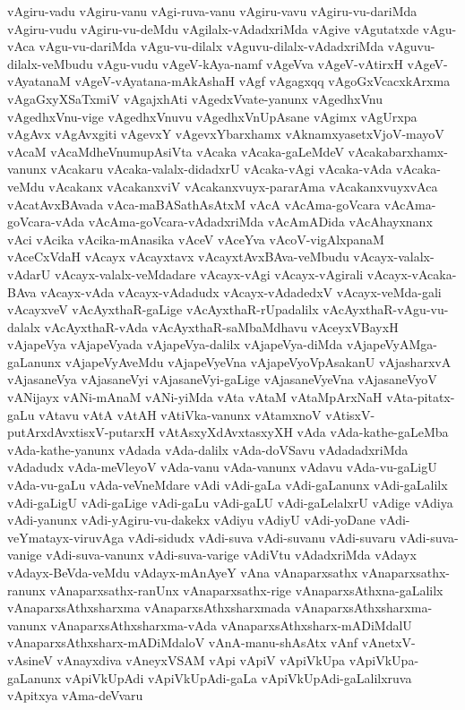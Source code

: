 {vAgiru-vadu
vAgiru-vanu
vAgi-ruva-vanu
vAgiru-vavu
vAgiru-vu-dariMda
vAgiru-vudu
vAgiru-vu-deMdu
vAgilalx-vAdadxriMda
vAgive
vAgutatxde
vAgu-vAca
vAgu-vu-dariMda
vAgu-vu-dilalx
vAguvu-dilalx-vAdadxriMda
vAguvu-dilalx-veMbudu
vAgu-vudu
vAgeV-kAya-namf
vAgeVva
vAgeV-vAtirxH
vAgeV-vAyatanaM
vAgeV-vAyatana-mAkAshaH
vAgf
vAgagxqq
vAgoGxVcacxkArxma
vAgaGxyXSaTxmiV
vAgajxhAti
vAgedxVvate-yanunx
vAgedhxVnu
vAgedhxVnu-vige
vAgedhxVnuvu
vAgedhxVnUpAsane
vAgimx
vAgUrxpa
vAgAvx
vAgAvxgiti
vAgevxY
vAgevxYbarxhamx
vAknamxyasetxVjoV-mayoV
vAcaM
vAcaMdheVnumupAsiVta
vAcaka
vAcaka-gaLeMdeV
vAcakabarxhamx-vanunx
vAcakaru
vAcaka-valalx-didadxrU
vAcaka-vAgi
vAcaka-vAda
vAcaka-veMdu
vAcakanx
vAcakanxviV
vAcakanxvuyx-pararAma
vAcakanxvuyxvAca
vAcatAvxBAvada
vAca-maBASathAsAtxM
vAcA
vAcAma-goVcara
vAcAma-goVcara-vAda
vAcAma-goVcara-vAdadxriMda
vAcAmADida
vAcAhayxnanx
vAci
vAcika
vAcika-mAnasika
vAceV
vAceYva
vAcoV-vigAlxpanaM
vAceCxVdaH
vAcayx
vAcayxtavx
vAcayxtAvxBAva-veMbudu
vAcayx-valalx-vAdarU
vAcayx-valalx-veMdadare
vAcayx-vAgi
vAcayx-vAgirali
vAcayx-vAcaka-BAva
vAcayx-vAda
vAcayx-vAdadudx
vAcayx-vAdadedxV
vAcayx-veMda-gali
vAcayxveV
vAcAyxthaR-gaLige
vAcAyxthaR-rUpadalilx
vAcAyxthaR-vAgu-vu-dalalx
vAcAyxthaR-vAda
vAcAyxthaR-saMbaMdhavu
vAceyxVBayxH
vAjapeVya
vAjapeVyada
vAjapeVya-dalilx
vAjapeVya-diMda
vAjapeVyAMga-gaLanunx
vAjapeVyAveMdu
vAjapeVyeVna
vAjapeVyoVpAsakanU
vAjasharxvA
vAjasaneVya
vAjasaneVyi
vAjasaneVyi-gaLige
vAjasaneVyeVna
vAjasaneVyoV
vANijayx
vANi-mAnaM
vANi-yiMda
vAta
vAtaM
vAtaMpArxNaH
vAta-pitatx-gaLu
vAtavu
vAtA
vAtAH
vAtiVka-vanunx
vAtamxnoV
vAtisxV-putArxdAvxtisxV-putarxH
vAtAsxyXdAvxtasxyXH
vAda
vAda-kathe-gaLeMba
vAda-kathe-yanunx
vAdada
vAda-dalilx
vAda-doVSavu
vAdadadxriMda
vAdadudx
vAda-meVleyoV
vAda-vanu
vAda-vanunx
vAdavu
vAda-vu-gaLigU
vAda-vu-gaLu
vAda-veVneMdare
vAdi
vAdi-gaLa
vAdi-gaLanunx
vAdi-gaLalilx
vAdi-gaLigU
vAdi-gaLige
vAdi-gaLu
vAdi-gaLU
vAdi-gaLelalxrU
vAdige
vAdiya
vAdi-yanunx
vAdi-yAgiru-vu-dakekx
vAdiyu
vAdiyU
vAdi-yoDane
vAdi-veYmatayx-viruvAga
vAdi-sidudx
vAdi-suva
vAdi-suvanu
vAdi-suvaru
vAdi-suva-vanige
vAdi-suva-vanunx
vAdi-suva-varige
vAdiVtu
vAdadxriMda
vAdayx
vAdayx-BeVda-veMdu
vAdayx-mAnAyeY
vAna
vAnaparxsathx
vAnaparxsathx-ranunx
vAnaparxsathx-ranUnx
vAnaparxsathx-rige
vAnaparxsAthxna-gaLalilx
vAnaparxsAthxsharxma
vAnaparxsAthxsharxmada
vAnaparxsAthxsharxma-vanunx
vAnaparxsAthxsharxma-vAda
vAnaparxsAthxsharx-mADiMdalU
vAnaparxsAthxsharx-mADiMdaloV
vAnA-manu-shAsAtx
vAnf
vAnetxV-vAsineV
vAnayxdiva
vAneyxVSAM
vApi
vApiV
vApiVkUpa
vApiVkUpa-gaLanunx
vApiVkUpAdi
vApiVkUpAdi-gaLa
vApiVkUpAdi-gaLalilxruva
vApitxya
vAma-deVvaru
}
